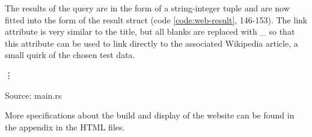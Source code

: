 The results of the query are in the form of a string-integer tuple and are now fitted into the form of the result struct (code \ref{code:web-result}, 146-153). The link attribute is very similar to the title, but all blanks are replaced with \_ so that this attribute can be used to link directly to the associated Wikipedia article, a small quirk of the chosen test data.
\begin{codeenv}
    \label{code:web-result}
    
    \vdots
    
    \centerline{Source: main.rs}
\end{codeenv}
More specifications about the build and display of the website can be found in the appendix in the HTML files.